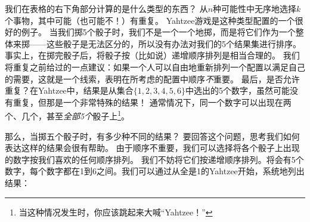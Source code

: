 我们在表格的右下角部分计算的是什么类型的东西？
从$n$种可能性中无序地选择$k$个事物，其中可能（也可能不！）有重复。
Yahtzee游戏是这种类型配置的一个很好的例子。
当我们掷5个骰子时，我们不是一个一个地掷，而是将它们作为一个整体来掷——这些骰子是无法区分的，所以没有办法对我们的5个结果集进行排序。
事实上，在掷完骰子后，将骰子按（比如说）递增顺序排列是相当合理的。
我们将重复之前给过的一点建议：如果一个人可以自由地重新排列一个配置以满足自己的需要，这就是一个线索，表明在所考虑的配置中顺序\emph{不}重要。
最后，是否允许重复？在Yahtzee中，结果是从集合$\{1,2,3,4,5,6\}$中选出的5个数字，虽然可能没有重复，但那是一个非常特殊的结果！
通常情况下，同一个数字可以出现在两个、几个，甚至\emph{全部5个}骰子上\footnote{当这种情况发生时，你应该跳起来大喊“Yahtzee！”}。

那么，当掷五个骰子时，有多少种不同的结果？
要回答这个问题，思考我们如何表达这样的结果会很有帮助。
由于顺序不重要，我们可以选择将各个骰子上出现的数字按我们喜欢的任何顺序排列。
我们不妨将它们按递增顺序排列。将会有5个数字，每个数字都在1到6之间。我们可以通过从全是1的Yahtzee开始，系统地列出结果：

